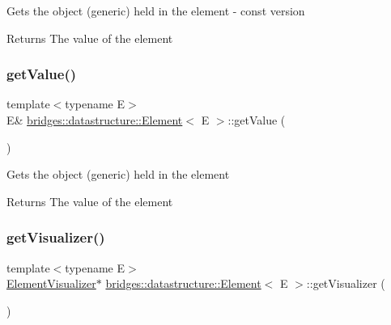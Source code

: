Gets the object (generic) held in the element -\/ const version \begin{DoxyReturn}{Returns}
The value of the element 
\end{DoxyReturn}
\mbox{\label{classbridges_1_1datastructure_1_1_element_abba0b4c03eb6fd08aed17eeb3be5bd1b}} 
\subsubsection{\texorpdfstring{get\+Value()}{getValue()}\hspace{0.1cm}{\footnotesize\ttfamily [2/2]}}
{\footnotesize\ttfamily template$<$typename E$>$ \\
E\& \hyperlink{classbridges_1_1datastructure_1_1_element}{bridges\+::datastructure\+::\+Element}$<$ E $>$\+::get\+Value (\begin{DoxyParamCaption}{ }\end{DoxyParamCaption})\hspace{0.3cm}{\ttfamily [inline]}}

Gets the object (generic) held in the element \begin{DoxyReturn}{Returns}
The value of the element 
\end{DoxyReturn}
\mbox{\label{classbridges_1_1datastructure_1_1_element_ad4f9ca479938bacd4586df8e7ede2116}} 
\subsubsection{\texorpdfstring{get\+Visualizer()}{getVisualizer()}\hspace{0.1cm}{\footnotesize\ttfamily [1/2]}}
{\footnotesize\ttfamily template$<$typename E$>$ \\
\hyperlink{classbridges_1_1datastructure_1_1_element_visualizer}{Element\+Visualizer}$\ast$ \hyperlink{classbridges_1_1datastructure_1_1_element}{bridges\+::datastructure\+::\+Element}$<$ E $>$\+::get\+Visualizer (\begin{DoxyParamCaption}{ }\end{DoxyParamCaption})\hspace{0.3cm}{\ttfamily [inline]}}

